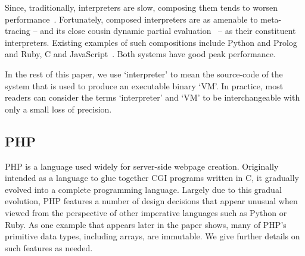 \documentclass[a4paper,UKenglish]{lipics-v2016}
\begin{document}
Since, traditionally, interpreters are slow, composing them tends to worsen
performance~\cite{barrett15approaches}. Fortunately, composed interpreters are as amenable to
meta-tracing -- and its close cousin dynamic partial evaluation~\cite{wuerthinger13onevm} --
as their constituent interpreters. Existing
examples of such compositions include Python and Prolog~\cite{barrett15approaches}
and Ruby, C and JavaScript~\cite{grimmer15interop}. Both systems have good
peak performance.

In the rest of this paper, we use `interpreter' to mean the source-code of the
system that is used to produce an executable binary `VM'. In practice, most readers
can consider the terms `interpreter' and `VM' to be interchangeable with only
a small loss of precision.


\subsection{PHP}

PHP is a language used widely for server-side webpage creation. Originally intended as a language
to glue together CGI programs written in C, it
gradually evolved into a complete programming language. Largely due to this
gradual evolution, PHP features a number of design decisions that appear unusual
when viewed from the perspective of other imperative languages such as Python or
Ruby. As one example that appears later in the paper shows, many of PHP's primitive
data types, including arrays, are immutable.
We give further details on such features as needed.
\end{document}
